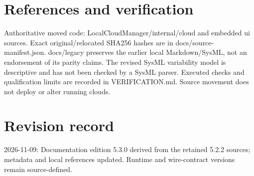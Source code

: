 \documentclass[a4paper]{arrowhead}
\begin{document}
\section{References and verification}
Authoritative moved code: LocalCloudManager/internal/cloud and embedded ui sources. Exact original/relocated SHA256 hashes are in docs/source-manifest.json. docs/legacy preserves the earlier local Markdown/SysML, not an endorsement of its parity claims. The revised SysML variability model is descriptive and has not been checked by a SysML parser. Executed checks and qualification limits are recorded in VERIFICATION.md. Source movement does not deploy or alter running clouds.
\section{Revision record}
2026-11-09: Documentation edition 5.3.0 derived from the retained 5.2.2 sources; metadata and local references updated. Runtime and wire-contract versions remain source-defined.
\end{document}

